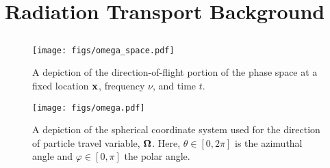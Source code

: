 \documentclass[../doc.tex]{subfiles}
\begin{document}
\chapter{Radiation Transport Background} \label{chap:transport}
\section{}
\section{}
\section{}
\section{}
\section{}

\begin{figure}
\centering
\texttt{[image: figs/omega\_space.pdf]}
\caption{A depiction of the direction-of-flight portion of the phase space at a fixed location $\boldsymbol{\mathrm{x}}$, frequency $\nu$, and time $t$. }
\label{trans:omega_space_diag}
\end{figure}

\begin{figure}
\centering
\texttt{[image: figs/omega.pdf]}
\caption{A depiction of the spherical coordinate system used for the direction of particle travel variable, $\boldsymbol{\Omega}$. Here, $\theta \in [0,2\pi]$ is the azimuthal angle and $\varphi \in [0,\pi]$ the polar angle. }
\label{trans:omega_diagram}
\end{figure}
\end{document}
